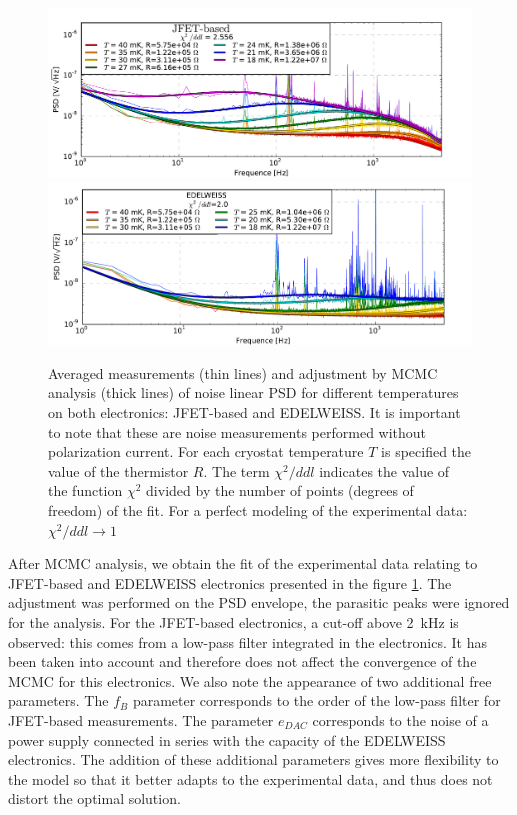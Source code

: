 \begin{figure}
\begin{center}
\includegraphics[width=\textwidth]{Figures/Ethem/cuore_fit_fin.pdf}
\includegraphics[width=\textwidth]{Figures/Ethem/edel_fit_fin.pdf}
\end{center}
\caption{Averaged measurements (thin lines) and adjustment by MCMC analysis (thick lines) of noise linear PSD for different temperatures on both electronics: JFET-based and EDELWEISS. It is important to note that these are noise measurements performed without polarization current. For each cryostat temperature $T$ is specified the value of the thermistor $R$. The term $\chi^2/ddl$ indicates the value of the function $\chi^2$ divided by the number of points (degrees of freedom) of the fit. For a perfect modeling of the experimental data: $\chi^2/ddl \rightarrow 1$}
\label{fig:rainbow-plot}
\end{figure}

After MCMC analysis, we obtain the fit of the experimental data relating to JFET-based and EDELWEISS electronics presented in the figure \ref{fig:rainbow-plot}. The adjustment was performed on the PSD envelope, the parasitic peaks were ignored for the analysis. For the JFET-based electronics, a cut-off above \SI{2}{\kilo\Hz} is observed: this comes from a low-pass filter integrated in the electronics. It has been taken into account and therefore does not affect the convergence of the MCMC for this electronics. We also note the appearance of two additional free parameters. The $f_B$ parameter corresponds to the order of the low-pass filter for JFET-based measurements. The parameter $e_{DAC}$ corresponds to the noise of a power supply connected in series with the capacity of the EDELWEISS electronics. The addition of these additional parameters gives more flexibility to the model so that it better adapts to the experimental data, and thus does not distort the optimal solution.

